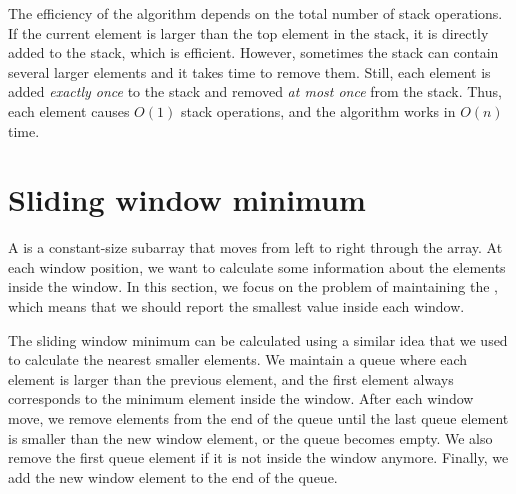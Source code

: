 \begin{center}
\end{center}

The efficiency of the algorithm depends on
the total number of stack operations.
If the current element is larger than
the top element in the stack, it is directly
added to the stack, which is efficient.
However, sometimes the stack can contain several
larger elements and it takes time to remove them.
Still, each element is added \emph{exactly once} to the stack
and removed \emph{at most once} from the stack.
Thus, each element causes $O(1)$ stack operations,
and the algorithm works in $O(n)$ time.

\section{Sliding window minimum}


A  is a constant-size subarray
that moves from left to right through the array.
At each window position,
we want to calculate some information
about the elements inside the window.
In this section, we focus on the problem
of maintaining the ,
which means that
we should report the smallest value inside each window.

The sliding window minimum can be calculated
using a similar idea that we used to calculate
the nearest smaller elements.
We maintain a queue
where each element is larger than
the previous element,
and the first element
always corresponds to the minimum element inside the window.
After each window move,
we remove elements from the end of the queue
until the last queue element
is smaller than the new window element,
or the queue becomes empty.
We also remove the first queue element
if it is not inside the window anymore.
Finally, we add the new window element
to the end of the queue.

